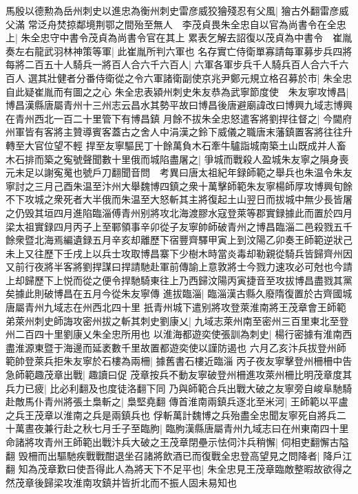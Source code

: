 馬殷以德勲為岳州刺史以進忠為衡州刺史雷彦威狡獪殘忍有父風|{
	獪古外翻雷彦威父滿}
常泛舟焚掠鄰境荆鄂之間殆至無人　李茂貞畏朱全忠自以官為尚書令在全忠上|{
	朱全忠守中書令茂貞為尚書令官在其上}
累表乞解去詔復以茂貞為中書令　崔胤奏左右龍武羽林神策等軍|{
	此崔胤所判六軍也}
名存實亡侍衛單寡請每軍募步兵四將每將二百五十人騎兵一將百人合六千六百人|{
	六軍各軍步兵千人騎兵百人合六千六百人}
選其壯健者分番侍衛從之令六軍諸衛副使京兆尹鄭元規立格召募於市|{
	朱全忠自此疑崔胤而有圖之之心}
朱全忠表潁州刺史朱友恭為武寧節度使　朱友寧攻博昌|{
	博昌漢縣唐屬青州十三州志云昌水其勢平故曰博昌後唐避廟諱改曰博興九域志博興在青州西北一百二十里管下有博昌鎮}
月餘不拔朱全忠怒遣客將劉捍往督之|{
	今閫府州軍皆有客將主贊導賓客蓋古之舍人中涓漢之鈴下威儀之職唐末藩鎮置客將往往升轉至大官位望不輕}
捍至友寧驅民丁十餘萬負木石牽牛驢詣城南築土山既成并人畜木石排而築之寃號聲聞數十里俄而城陷盡屠之|{
	爭城而戰殺人盈城朱友寧之隕身喪元未足以謝寃䰟也號戶刀翻聞音問　考異曰唐太祖紀年録師範之舉兵也朱温令朱友寧討之三月己酉朱温至汴州大舉魏博四鎮之衆十萬擊師範朱友寧楊師厚攻博興旬餘不下攻城之衆死者大半俄而朱温至大怒斬其主將復起土山翌日而拔城中無少長皆屠之仍毁其垣四月進陷臨淄傅青州别將攻北海渡膠水寇登萊等郡實録據此而置於四月梁太祖實録四月丙子上至鄆領事辛卯從子友寧帥師破青州之博昌臨淄二邑殺戮五千餘衆暨北海焉編遺録五月辛亥却離歷下宿豐齊驛甲寅上到汶陽乙卯奏王師範逆狀己未上又往歷下壬戌上以兵士攻取博昌寨下少樹木時當炎毒却勒親從騎兵皆歸齊州因又前行夜將半客將劉捍謀曰捍請馳赴軍前傳諭上意敦將士今戮力速攻必可尅也今請上却歸歷下上悦而從之便令捍馳騎東往上乃西歸汶陽丙寅捷音至攻拔博昌盡戮其黨矣據此則破博昌在五月今從朱友寧傳}
進拔臨淄|{
	臨淄漢古縣久廢隋復置於古齊國城唐屬青州九域志在州西北四十里}
扺青州城下遣别將攻登萊淮南將王茂章會王師範弟萊州刺史師誨攻密州拔之斬其刺史劉康乂|{
	九域志萊州南至密州三百里東北至登州二百四十里劉康乂朱全忠所用也}
以淮海都遊奕使張訓為刺史|{
	楊行密據有淮南西盡淮源東暨于海邊而延袤數千里故置都遊奕使以謹防遏也}
六月乙亥汴兵拔登州師範帥登萊兵拒朱友寧於石樓為兩柵|{
	據舊書石樓近臨淄}
丙子夜友寧擊登州柵柵中告急師範趣茂章出戰|{
	趣讀曰促}
茂章按兵不動友寧破登州柵進攻萊州柵比明茂章度其兵力已疲|{
	比必利翻及也度徒洛翻下同}
乃與師範合兵出戰大破之友寧旁自峻阜馳騎赴敵馬仆青州將張土梟斬之|{
	梟堅堯翻}
傳首淮南兩鎮兵逐北至米河|{
	王師範以平盧之兵王茂章以淮南之兵是兩鎮兵也}
俘斬萬計魏博之兵殆盡全忠聞友寧死自將兵二十萬晝夜兼行赴之秋七月壬子至臨胊|{
	臨朐漢縣唐屬青州九域志曰在州東南四十里}
命諸將攻青州王師範出戰汴兵大破之王茂章閉壘示怯伺汴兵稍懈|{
	伺相吏翻懈古隘翻}
毁柵而出驅馳疾戰戰酣退坐召諸將飲酒已而復戰全忠登高望見之問降者|{
	降戶江翻}
知為茂章歎曰使吾得此人為將天下不足平也|{
	朱全忠見王茂章臨敵整暇故欲得之然茂章後歸梁攻淮南攻鎮并皆折北而不振人固未易知也}
